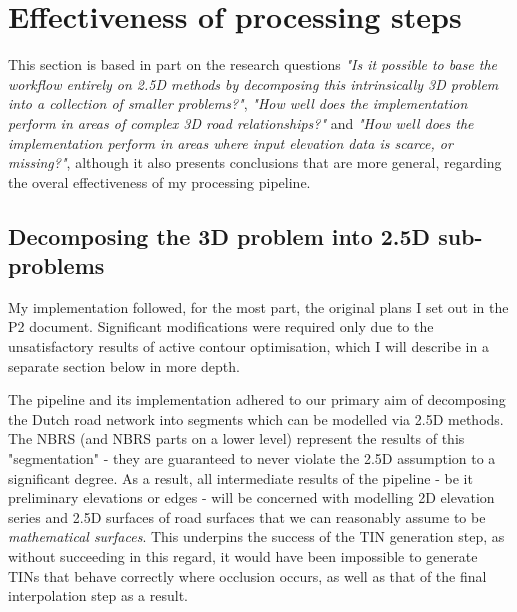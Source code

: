 \section{Effectiveness of processing steps}
\label{sec:effectiveness}

This section is based in part on the research questions \textit{"Is it possible to base the workflow entirely on 2.5D methods by decomposing this intrinsically 3D problem into a collection of smaller problems?"}, \textit{"How well does the implementation perform in areas of complex 3D road relationships?"} and \textit{"How well does the implementation perform in areas where input elevation data is scarce, or missing?"}, although it also presents conclusions that are more general, regarding the overal effectiveness of my processing pipeline.

\subsection{Decomposing the 3D problem into 2.5D sub-problems}
\label{sub:effectivenessdecomposition}

My implementation followed, for the most part, the original plans I set out in the P2 document. Significant modifications were required only due to the unsatisfactory results of active contour optimisation, which I will describe in a separate section below in more depth.

The pipeline and its implementation adhered to our primary aim of decomposing the Dutch road network into segments which can be modelled via 2.5D methods. The NBRS (and NBRS parts on a lower level) represent the results of this "segmentation" - they are guaranteed to never violate the 2.5D assumption to a significant degree. As a result, all intermediate results of the pipeline - be it preliminary elevations or edges - will be concerned with modelling 2D elevation series and 2.5D surfaces of road surfaces that we can reasonably assume to be \textit{mathematical surfaces}. This underpins the success of the TIN generation step, as without succeeding in this regard, it would have been impossible to generate TINs that behave correctly where occlusion occurs, as well as that of the final interpolation step as a result.

